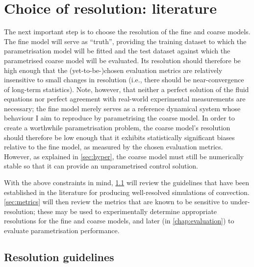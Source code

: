 \documentclass[../main.tex]{subfiles}
\begin{document}
\section{Choice of resolution: literature} \label{sec:resolution}
The next important step is to choose the resolution of the fine and coarse
models. The fine model will serve as ``truth'', providing the training dataset
to which the parametrisation model will be fitted and the test dataset against
which the parametrised coarse model will be evaluated. Its resolution should
therefore be high enough that the (yet-to-be-)chosen evaluation metrics are
relatively insensitive to small changes in resolution (i.e., there should be
near-convergence of long-term statistics). Note, however, that neither a
perfect solution of the fluid equations nor perfect agreement with real-world
experimental measurements are necessary; the fine model merely serves as a
reference dynamical system whose behaviour I aim to reproduce by parametrising
the coarse model. In order to create a worthwhile parametrisation problem, the
coarse model's resolution should therefore be low enough that it exhibits
statistically significant biases relative to the fine model, as measured by the
chosen evaluation metrics. However, as explained in \cref{sec:hyper}, the
coarse model must still be numerically stable so that it can provide an
unparametrised control solution.

With the above constraints in mind, \cref{sec:res_requirements} will review the
guidelines that have been established in the literature for producing
well-resolved simulations of \rb{} convection. \cref{sec:metrics} will
then review the metrics that are known to be sensitive to under-resolution;
these may be used to experimentally determine appropriate resolutions for the
fine and coarse models, and later (in \cref{chap:evaluation}) to evaluate
parametrisation performance.


\subsection{Resolution guidelines}
\label{sec:res_requirements}
\end{document}
